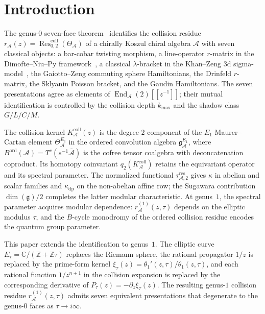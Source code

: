 \documentclass[11pt]{article}
\theoremstyle{plain}
\theoremstyle{definition}
\theoremstyle{remark}
\newcommand{\fg}{\mathfrak{g}}
\newcommand{\cA}{\mathcal{A}}
\newcommand{\Res}{\operatorname{Res}}
\DeclareMathOperator{\End}{End}
\numberwithin{equation}{section}
\begin{document}

\section{Introduction}\label{sec:intro}

The genus-$0$ seven-face theorem~\cite{Lorgat26} identifies the
collision residue $r_\cA(z) = \Res^{\mathrm{coll}}_{0,2}(\Theta_\cA)$
of a chirally Koszul chiral algebra $\cA$ with seven classical
objects: a bar-cobar twisting morphism, a line-operator $r$-matrix in
the Dimofte--Niu--Py framework~\cite{DNP25}, a classical
$\lambda$-bracket in the Khan--Zeng 3d sigma-model~\cite{KhanZeng25},
the Gaiotto--Zeng commuting sphere Hamiltonians, the Drinfeld
$r$-matrix, the Sklyanin Poisson bracket, and the Gaudin
Hamiltonians. The seven presentations agree as elements of
$\End_\cA(2)[\![z^{-1}]\!]$; their mutual identification is
controlled by the collision depth $k_{\max}$ and the shadow class
$G/L/C/M$.

The collision kernel $K_\cA^{\mathrm{coll}}(z)$ is the degree-$2$ component of
the $E_1$ Maurer--Cartan element
$\Theta^{E_1}_\cA$ in the ordered convolution algebra
$\mathfrak{g}^{E_1}_\cA$, where
$B^{\mathrm{ord}}(\cA) = T^c(s^{-1}\bar{\cA})$ is the cofree tensor
coalgebra with deconcatenation coproduct. Its homotopy coinvariant
$q_2(K_\cA^{\mathrm{coll}})$ retains the equivariant operator and its
spectral parameter.  The normalized functional
$\tau_{\cA,2}^{\mathrm{res}}$ gives $\kappa$ in abelian and scalar
families and $\kappa_{\mathrm{dp}}$ on the non-abelian affine row;
the Sugawara contribution $\dim(\fg)/2$ completes the latter modular
characteristic. At genus~$1$, the spectral parameter acquires
modular dependence: $r^{(1)}_\cA(z,\tau)$ depends on the elliptic
modulus $\tau$, and the $B$-cycle monodromy of the ordered collision
residue encodes the quantum group parameter.

This paper extends the identification to genus~$1$. The elliptic
curve $E_\tau = \mathbb{C}/(\mathbb{Z}+\mathbb{Z}\tau)$ replaces the
Riemann sphere, the rational propagator $1/z$ is replaced by the
prime-form kernel
\(\xi_\tau(z)=\theta_1'(z,\tau)/\theta_1(z,\tau)\), and each rational
function $1/z^{n+1}$ in the collision expansion is replaced by the
corresponding derivative of
\(P_\tau(z)=-\partial_z\xi_\tau(z)\). The resulting genus-$1$
collision residue
$r_\cA^{(1)}(z,\tau)$ admits seven equivalent presentations that
degenerate to the genus-$0$ faces as $\tau \to i\infty$.
\end{document}
